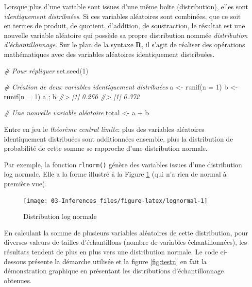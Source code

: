 \documentclass[
]{book}
\newenvironment{Shaded}{}{}
\newcommand{\AttributeTok}[1]{#1}
\newcommand{\CommentTok}[1]{\textit{#1}}
\newcommand{\DecValTok}[1]{#1}
\newcommand{\FunctionTok}[1]{#1}
\newcommand{\NormalTok}[1]{#1}
\newcommand{\OtherTok}[1]{#1}
\newcommand{\SpecialCharTok}[1]{#1}
\begin{document}
Lorsque plus d'une variable sont issues d'une même boîte (distribution), elles sont \emph{identiquement distribuées}. Si ces variables aléatoires sont combinées, que ce soit en termes de produit, de quotient, d'addition, de soustraction, le résultat est une nouvelle variable aléatoire qui possède sa propre distribution nommée \emph{distribution d'échantillonnage}. Sur le plan de la syntaxe \textbf{R}, il s'agit de réaliser des opérations mathématiques avec des variables aléatoires identiquement distribuées.

\begin{Shaded}
\begin{Highlighting}[]
\CommentTok{\# Pour répliquer}
\FunctionTok{set.seed}\NormalTok{(}\DecValTok{1}\NormalTok{)}

\CommentTok{\# Création de deux variables identiquement distribuées}
\NormalTok{a }\OtherTok{\textless{}{-}} \FunctionTok{runif}\NormalTok{(}\AttributeTok{n =} \DecValTok{1}\NormalTok{)}
\NormalTok{b }\OtherTok{\textless{}{-}} \FunctionTok{runif}\NormalTok{(}\AttributeTok{n =} \DecValTok{1}\NormalTok{)}
\NormalTok{a ; b}
\CommentTok{\#\textgreater{} [1] 0.266}
\CommentTok{\#\textgreater{} [1] 0.372}

\CommentTok{\# Une nouvelle variable aléatoire}
\NormalTok{total }\OtherTok{\textless{}{-}}\NormalTok{ a }\SpecialCharTok{+}\NormalTok{ b}
\end{Highlighting}
\end{Shaded}

Entre en jeu le \emph{théorème central limite}: plus des variables aléatoires identiquement distribuées sont additionnées ensemble, plus la distribution de probabilité de cette somme se rapproche d'une distribution normale.

Par exemple, la fonction \texttt{rlnorm()} génère des variables issues d'une distribution log normale. Elle a la forme illustré à la Figure \ref{fig:lognormal} (qui n'a rien de normal à première vue).

\begin{figure}

{\centering \texttt{[image: 03-Inferences\_files/figure-latex/lognormal-1]} 

}

\caption{Distribution log normale}\label{fig:lognormal}
\end{figure}

En calculant la somme de plusieurs variables aléatoires de cette distribution, pour diverses valeurs de tailles d'échantillons (nombre de variables échantillonnées), les résultats tendent de plus en plus vers une distribution normale. Le code ci-dessous présente la démarche utilisée et la figure \ref{fig:testn} en fait la démonstration graphique en présentant les distributions d'échantillonnage obtenues.
\end{document}
